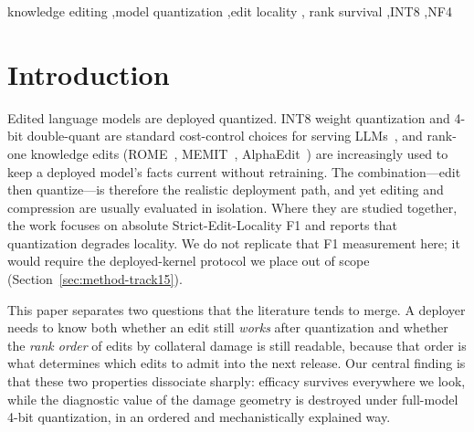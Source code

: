\documentclass[preprint,12pt]{elsarticle}
\begin{document}
\begin{frontmatter}
\begin{abstract}
edit-attributable damage orders cross-probe rank survival across all 36 arm-cells at
Spearman $\rho=\pNsrRhoFlat{}$, against $\rho=\pNoiseRhoFlat{}$ for unnormalised noise
on the same outcome. Two consequences follow. Restricting the quantizer to the edited
layer and preferring INT8 both act by shrinking injected noise, and edited-layer INT8 is
the only arm preserving the diagnostic in all nine cells --- a deployment rule that
costs nothing to apply. And a paired hierarchical bootstrap ($n=\pBootNBoot{}$, paired
on edits) finds \emph{none} of \pBootNContrasts{} editor contrasts distinguishable at
95\%, so the editor ordering suggested by point estimates alone is not supported.
\end{abstract}

\begin{keyword}
knowledge editing \sep model quantization \sep edit locality \sep
rank survival \sep INT8 \sep NF4
\end{keyword}

\end{frontmatter}

\section{Introduction}
\label{sec:intro}

Edited language models are deployed quantized. INT8 weight quantization and 4-bit
double-quant are standard cost-control choices for serving
LLMs~\cite{hallucinationsurvey2023,kesurvey2023}, and rank-one knowledge edits
(ROME~\cite{rome2022}, MEMIT~\cite{memit2023}, AlphaEdit~\cite{alphaedit2025}) are
increasingly used to keep a deployed model's facts current without retraining. The
combination---edit then quantize---is therefore the realistic deployment path, and yet
editing and compression are usually evaluated in isolation. Where they are studied
together, the work focuses on absolute Strict-Edit-Locality F1 and reports that
quantization degrades locality. We do not replicate that F1 measurement here; it would
require the deployed-kernel protocol we place out of scope
(Section~\ref{sec:method-track15}).

This paper separates two questions that the literature tends to merge. A deployer needs
to know both whether an edit still \emph{works} after quantization and whether the
\emph{rank order} of edits by collateral damage is still readable, because that order is
what determines which edits to admit into the next release. Our central finding is that
these two properties dissociate sharply: efficacy survives everywhere we look, while the
diagnostic value of the damage geometry is destroyed under full-model 4-bit
quantization, in an ordered and mechanistically explained way.
\end{document}
